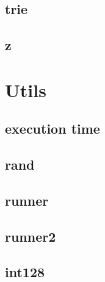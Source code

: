 \subsection{trie}
\raggedbottom
\hrulefill
\subsection{z}
\raggedbottom
\hrulefill

\section{Utils}
\subsection{execution time}
\raggedbottom
\hrulefill
\subsection{rand}
\raggedbottom
\hrulefill
\subsection{runner}
\raggedbottom
\hrulefill
\subsection{runner2}
\raggedbottom
\hrulefill
\subsection{  int128}
\raggedbottom
\hrulefill


